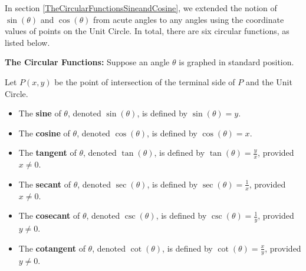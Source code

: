 \documentclass{ximera}
\begin{document}
	\author{Stitz-Zeager}




\setcounter{footnote}{0}

\label{TheOtherCircularFunctions}

In section \ref{TheCircularFunctionsSineandCosine},  we extended the notion of $\sin(\theta)$ and $\cos(\theta)$  from acute angles to any angles using the coordinate values of points on the Unit Circle. In total, there are six circular functions, as listed below.




\begin{definition} \label{circularfunctions}  \textbf{The Circular Functions:} Suppose an angle $\theta$ is graphed in standard position. 



Let $P(x,y)$ be the point of intersection of the terminal side of $P$ and the Unit Circle. 


 \begin{itemize}

\item The  \textbf{sine} of $\theta$, denoted $\sin(\theta)$, is defined by $\sin(\theta) = y$. 

\item The  \textbf{cosine} of $\theta$, denoted $\cos(\theta)$, is defined by $\cos(\theta) = x$. 

\item The  \textbf{tangent} of $\theta$, denoted $\tan(\theta)$, is defined by $\tan(\theta) = \frac{y}{x}$, provided $x \neq 0$. 

\item The  \textbf{secant} of $\theta$, denoted $\sec(\theta)$, is defined by $\sec(\theta) = \frac{1}{x}$, provided $x \neq 0$. 

\item The  \textbf{cosecant} of $\theta$, denoted $\csc(\theta)$, is defined by $\csc(\theta) = \frac{1}{y}$, provided $y \neq 0$. 

\item The  \textbf{cotangent} of $\theta$, denoted $\cot(\theta)$, is defined by $\cot(\theta) = \frac{x}{y}$, provided $y \neq 0$. 

\end{itemize}

\end{definition}
\end{document}
